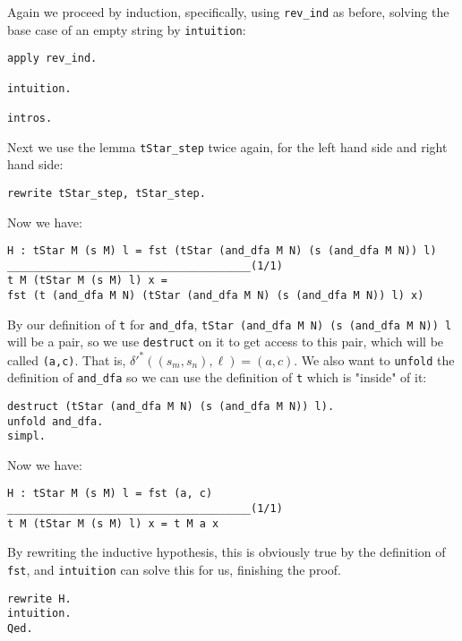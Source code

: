 Again we proceed by induction, specifically, using \texttt{rev_ind} as before, solving the base case of an empty string by \texttt{intuition}:

\begin{verbatim}
apply rev_ind.

intuition.

intros.
\end{verbatim}

Next we use the lemma \texttt{tStar_step} twice again, for the left hand side and right hand side:

\begin{verbatim}
rewrite tStar_step, tStar_step.
\end{verbatim}

Now we have:
\begin{verbatim}
H : tStar M (s M) l = fst (tStar (and_dfa M N) (s (and_dfa M N)) l)
______________________________________(1/1)
t M (tStar M (s M) l) x =
fst (t (and_dfa M N) (tStar (and_dfa M N) (s (and_dfa M N)) l) x)
\end{verbatim}

By our definition of \texttt{t} for \texttt{and_dfa}, \texttt{tStar (and_dfa M N) (s (and_dfa M N)) l} will be a pair, so we use \texttt{destruct} on it to get access to this pair, which will be called \texttt{(a,c)}.
That is, $\delta'^*((s_m, s_n), \ell) = (a,c)$.
We also want to \texttt{unfold} the definition of \texttt{and_dfa} so we can use the definition of \texttt{t} which is "inside" of it:

\begin{verbatim}
destruct (tStar (and_dfa M N) (s (and_dfa M N)) l).
unfold and_dfa.
simpl.
\end{verbatim}

Now we have:

\begin{verbatim}
H : tStar M (s M) l = fst (a, c)
______________________________________(1/1)
t M (tStar M (s M) l) x = t M a x
\end{verbatim}

By rewriting the inductive hypothesis, this is obviously true by the definition of \texttt{fst}, and \texttt{intuition} can solve this for us, finishing the proof.

\begin{verbatim}
rewrite H.
intuition.
Qed.
\end{verbatim}

